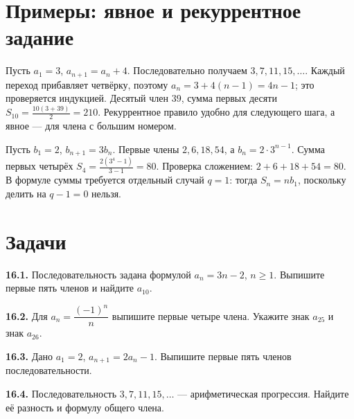 \section{Примеры: явное и рекуррентное задание}
\begin{example}Пусть \(a_1=3\), \(a_{n+1}=a_n+4\). Последовательно получаем \(3,7,11,15,\ldots\). Каждый переход прибавляет четвёрку, поэтому \(a_n=3+4(n-1)=4n-1\); это проверяется индукцией. Десятый член \(39\), сумма первых десяти \(S_{10}=\frac{10(3+39)}2=210\). Рекуррентное правило удобно для следующего шага, а явное --- для члена с большим номером.\end{example}
\begin{example}Пусть \(b_1=2\), \(b_{n+1}=3b_n\). Первые члены \(2,6,18,54\), а \(b_n=2\cdot3^{n-1}\). Сумма первых четырёх \(S_4=\frac{2(3^4-1)}{3-1}=80\). Проверка сложением: \(2+6+18+54=80\). В формуле суммы требуется отдельный случай \(q=1\): тогда \(S_n=nb_1\), поскольку делить на \(q-1=0\) нельзя.\end{example}
\section*{Задачи}
\begingroup\setlength{\parskip}{2pt}
\noindent\begin{minipage}[t]{\linewidth}\textbf{16.1.} Последовательность задана формулой \(a_n=3n-2\), \(n\geq1\). Выпишите первые пять членов и найдите \(a_{10}\).\par\end{minipage}\par
\noindent\begin{minipage}[t]{\linewidth}\textbf{16.2.} Для \(a_n=\dfrac{(-1)^n}{n}\) выпишите первые четыре члена. Укажите знак \(a_{25}\) и знак \(a_{26}\).\par\end{minipage}\par
\noindent\begin{minipage}[t]{\linewidth}\textbf{16.3.} Дано \(a_1=2\), \(a_{n+1}=2a_n-1\). Выпишите первые пять членов последовательности.\par\end{minipage}\par
\noindent\begin{minipage}[t]{\linewidth}\textbf{16.4.} Последовательность \(3,7,11,15,\ldots\) — арифметическая прогрессия. Найдите её разность и формулу общего члена.\par\end{minipage}\par
